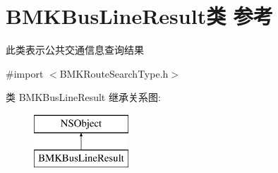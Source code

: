 \hypertarget{interface_b_m_k_bus_line_result}{}\section{B\+M\+K\+Bus\+Line\+Result类 参考}
\label{interface_b_m_k_bus_line_result}


此类表示公共交通信息查询结果  




{\ttfamily \#import $<$B\+M\+K\+Route\+Search\+Type.\+h$>$}

类 B\+M\+K\+Bus\+Line\+Result 继承关系图\+:\begin{figure}[H]
\begin{center}
\leavevmode
\includegraphics[height=2.000000cm]{interface_b_m_k_bus_line_result}
\end{center}
\end{figure}
